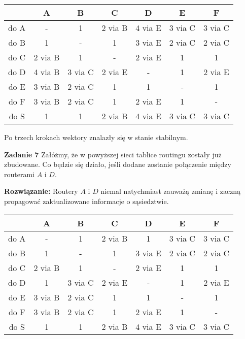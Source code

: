 \documentclass[12pt,a4paper]{article}
\begin{document}
\vskip 0.2cm
\begin{tabular}{ | c | c | c | c | c | c | c | }
 \hline
      &     A   &     B    &    C    &    D    &     E   &    F    \\
 \hline
 do A & -       & 1        & 2 via B & 4 via E & 3 via C & 3 via C \\
 do B & 1       & -        & 1       & 3 via E & 2 via C & 2 via C \\
 do C & 2 via B & 1        & -       & 2 via E & 1       & 1       \\
 do D & 4 via B & 3 via C  & 2 via E & -       & 1       & 2 via E \\
 do E & 3 via B & 2 via C  & 1       & 1       & -       & 1       \\
 do F & 3 via B & 2 via C  & 1       & 2 via E & 1       & -       \\
 do S & 1       & 1        & 2 via B & 4 via E & 3 via C & 3 via C \\
 \hline
\end{tabular}

\vskip 0.2cm
Po trzech krokach wektory znalazły się w stanie stabilnym.

\newpage
\noindent
\textbf{Zadanie 7} Załóżmy, że w powyższej sieci tablice routingu zostały już zbudowane. Co będzie się działo, jeśli dodane zostanie połączenie między routerami \(A\) i \(D\).
\vskip 0.2cm

\noindent
\textbf{Rozwiązanie:} Routery \(A\) i \(D\) niemal natychmiast zauważą zmianę i zaczną propagować zaktualizowane informacje o sąsiedztwie.

\vskip 0.2cm
\begin{tabular}{ | c | c | c | c | c | c | c | }
 \hline
      &     A   &     B    &    C    &    D    &     E   &    F    \\
 \hline
 do A & -       & 1        & 2 via B & 1       & 3 via C & 3 via C \\
 do B & 1       & -        & 1       & 3 via E & 2 via C & 2 via C \\
 do C & 2 via B & 1        & -       & 2 via E & 1       & 1       \\
 do D & 1       & 3 via C  & 2 via E & -       & 1       & 2 via E \\
 do E & 3 via B & 2 via C  & 1       & 1       & -       & 1       \\
 do F & 3 via B & 2 via C  & 1       & 2 via E & 1       & -       \\
 do S & 1       & 1        & 2 via B & 4 via E & 3 via C & 3 via C \\
 \hline
\end{tabular}
\end{document}
